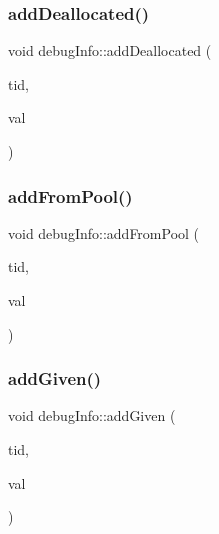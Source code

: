 \mbox{\label{classdebugInfo_ab7d4ff34c583547b23b28a2265d443a6}} 
\subsubsection{\texorpdfstring{add\+Deallocated()}{addDeallocated()}}
{\footnotesize\ttfamily void debug\+Info\+::add\+Deallocated (\begin{DoxyParamCaption}\item[{const int}]{tid,  }\item[{const int}]{val }\end{DoxyParamCaption})\hspace{0.3cm}{\ttfamily [inline]}}

\mbox{\label{classdebugInfo_ab197f2e453185fed7859a73c79922453}} 
\subsubsection{\texorpdfstring{add\+From\+Pool()}{addFromPool()}}
{\footnotesize\ttfamily void debug\+Info\+::add\+From\+Pool (\begin{DoxyParamCaption}\item[{const int}]{tid,  }\item[{const int}]{val }\end{DoxyParamCaption})\hspace{0.3cm}{\ttfamily [inline]}}

\mbox{\label{classdebugInfo_a723b7069dad22dd770a0c838973fb720}} 
\subsubsection{\texorpdfstring{add\+Given()}{addGiven()}}
{\footnotesize\ttfamily void debug\+Info\+::add\+Given (\begin{DoxyParamCaption}\item[{const int}]{tid,  }\item[{const int}]{val }\end{DoxyParamCaption})\hspace{0.3cm}{\ttfamily [inline]}}


